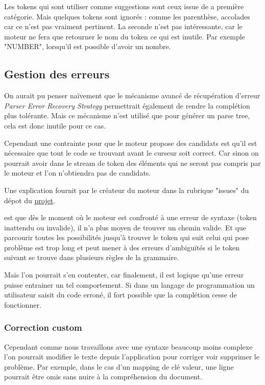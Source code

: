 \documentclass[
    iict, %
    il, %
]{heig-tb}
\begin{document}
Les tokens qui sont utiliser comme suggestions sont ceux issue de a première catégorie. Mais quelques tokens sont ignorés : comme les parenthèse, accolades car ce n'est pas vraiment pertinent. %
La seconde n'est pas intéressante, car le moteur ne fera que retourner le nom du token ce qui est inutile. Par exemple "NUMBER", lorsqu'il est possible d'avoir un nombre.

\subsection{Gestion des erreurs }\label{error handle}

On aurait pu penser naïvement que le mécanisme avancé de récupération d'erreur \emph{Parser Error Recovery Strategy} permettrait également de rendre la complétion plus tolérante.
Mais ce mécanisme n'est utilisé que pour générer un parse tree, cela est donc inutile pour ce cas.

Cependant une contrainte pour que le moteur propose des candidats est qu'il est nécessaire que tout le code se trouvant avant le curseur soit correct.
Car sinon on pourrait avoir dans le stream de token des éléments qui ne seront pas compris par le moteur et l'on n'obtiendra pas de candidats.

Une explication fournit par le créateur du moteur dans la rubrique "issues" du dépot du \href{ https://github.com/mike-lischke/antlr4-c3/issues/29}{projet}.

est que dès le moment où le moteur est confronté à une erreur de syntaxe (token inattendu ou invalide), il n'a plus moyen de trouver un chemin valide.
Et que parcourir toutes les possibilités jusqu'à trouver le token qui suit celui qui pose problème est trop long et peut mener à des erreurs d'ambiguïtés si le token suivant se trouve dans plusieurs règles de la grammaire.

Mais l'on pourrait s'en contenter, car finalement, il est logique qu'une erreur puisse entrainer un tel comportement.
Si dans un langage de programmation un utilisateur saisit du code erroné, il fort possible que la complétion cesse de fonctionner.

\subsubsection{Correction custom}
Cependant comme nous travaillons avec une syntaxe beaucoup moins complexe l'on pourrait modifier le texte depuis l'application pour corriger voir supprimer le problème.
Par exemple, dans le cas d'un mapping de clé valeur, une ligne pourrait être omis sans nuire à la compréhension du document.
\end{document}
